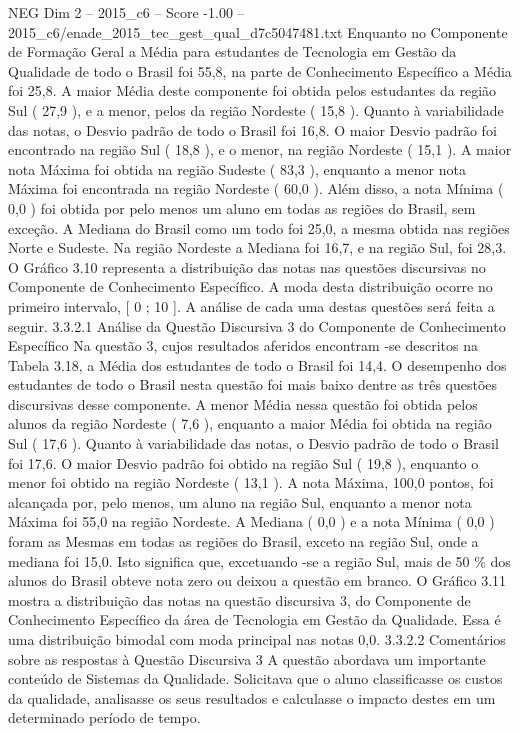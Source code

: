 \begin{textsample}{NEG Dim 2 – 2015\_c6 – Score -1.00 – 2015\_c6/enade\_2015\_tec\_gest\_qual\_d7c5047481.txt}
Enquanto no Componente de Formação Geral a Média para estudantes de Tecnologia em Gestão da Qualidade de todo o Brasil foi 55,8, na parte de Conhecimento Específico a Média foi 25,8.
A maior Média deste componente foi obtida pelos estudantes da região Sul ( 27,9 ), e a menor, pelos da região Nordeste ( 15,8 ).
Quanto à variabilidade das notas, o Desvio padrão de todo o Brasil foi 16,8.
O maior Desvio padrão foi encontrado na região Sul ( 18,8 ), e o menor, na região Nordeste ( 15,1 ).
A maior nota Máxima foi obtida na região Sudeste ( 83,3 ), enquanto a menor nota Máxima foi encontrada na região Nordeste ( 60,0 ).
Além disso, a nota Mínima ( 0,0 ) foi obtida por pelo menos um aluno em todas as regiões do Brasil, sem exceção.
A Mediana do Brasil como um todo foi 25,0, a mesma obtida nas regiões Norte e Sudeste.
Na região Nordeste a Mediana foi 16,7, e na região Sul, foi 28,3.
O Gráfico 3.10 representa a distribuição das notas nas questões discursivas no Componente de Conhecimento Específico.
A moda desta distribuição ocorre no primeiro intervalo, [ 0 ; 10 ].
A análise de cada uma destas questões será feita a seguir. 3.3.2.1 Análise da Questão Discursiva 3 do Componente de Conhecimento Específico Na questão 3, cujos resultados aferidos encontram -se descritos na Tabela 3.18, a Média dos estudantes de todo o Brasil foi 14,4.
O desempenho dos estudantes de todo o Brasil nesta questão foi mais baixo dentre as três questões discursivas desse componente.
A menor Média nessa questão foi obtida pelos alunos da região Nordeste ( 7,6 ), enquanto a maior Média foi obtida na região Sul ( 17,6 ).
Quanto à variabilidade das notas, o Desvio padrão de todo o Brasil foi 17,6.
O maior Desvio padrão foi obtido na região Sul ( 19,8 ), enquanto o menor foi obtido na região Nordeste ( 13,1 ).
A nota Máxima, 100,0 pontos, foi alcançada por, pelo menos, um aluno na região Sul, enquanto a menor nota Máxima foi 55,0 na região Nordeste.
A Mediana ( 0,0 ) e a nota Mínima ( 0,0 ) foram as Mesmas em todas as regiões do Brasil, exceto na região Sul, onde a mediana foi 15,0.
Isto significa que, excetuando -se a região Sul, mais de 50 \% dos alunos do Brasil obteve nota zero ou deixou a questão em branco.
O Gráfico 3.11 mostra a distribuição das notas na questão discursiva 3, do Componente de Conhecimento Específico da área de Tecnologia em Gestão da Qualidade.
Essa é uma distribuição bimodal com moda principal nas notas 0,0. 3.3.2.2 Comentários sobre as respostas à Questão Discursiva 3 A questão abordava um importante conteúdo de Sistemas da Qualidade.
Solicitava que o aluno classificasse os custos da qualidade, analisasse os seus resultados e calculasse o impacto destes em um determinado período de tempo.

\end{textsample}

